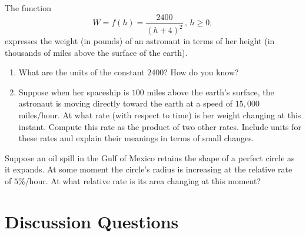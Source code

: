 \documentclass{ximera}
\begin{document}
\begin{question} \label{Qdf8r3fgdsf}
The function
\[
  W =f(h)  = \frac{2400}{(h+4)^2}  \, , \,h \geq 0 ,
\]
expresses the weight (in pounds) of an astronaut in terms of her height (in thousands of miles above the surface of the earth).

\begin{enumerate}
\item What are the units of the constant $2400$? How do you know?

\item Suppose when her spaceship is $100$ miles above the earth's surface, the astronaut is moving directly toward the earth at a speed of $15,000$ miles/hour. At what rate (with respect to time) is her weight changing at this instant. Compute this rate as the product of two other rates. Include units for these rates and explain their meanings in terms of small changes.
\end{enumerate}

\end{question}

\begin{question}  \label{QOdfdfrDFGDF}
Suppose an oil spill in the Gulf of Mexico retains the shape of a perfect circle as it expands. At some moment the circle's radius is increasing at the relative rate of $5\%$/hour. At what relative rate is its area changing at this moment?
\end{question}


\section{Discussion Questions}
\end{document}
